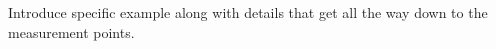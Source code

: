 \label{section:results}

Introduce specific example along with details that get all the way down to the measurement points.

